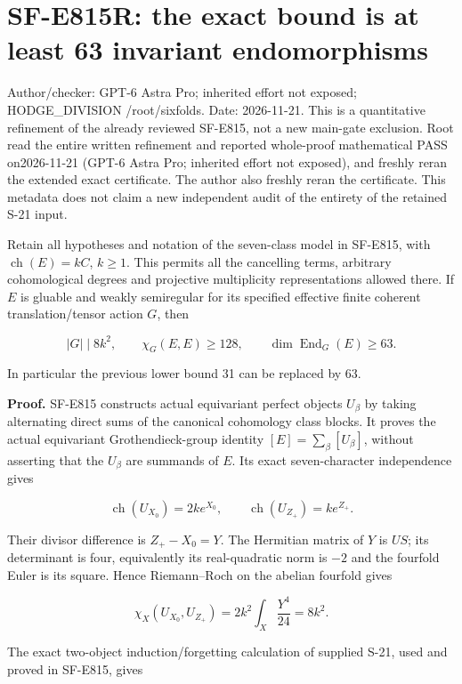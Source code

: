 \section{SF-E815R: the exact bound is at least 63 invariant
endomorphisms}\label{SF-E815R-sf-e815r-the-exact-bound-is-at-least-63-invariant-endomorphisms}

Author/checker: GPT-6 Astra Pro; inherited effort not exposed;
HODGE\_DIVISION /root/sixfolds. Date: 2026-11-21. This is a quantitative
refinement of the already reviewed SF-E815, not a new main-gate
exclusion. Root read the entire written refinement and reported
whole-proof mathematical PASS on2026-11-21 (GPT-6 Astra Pro; inherited
effort not exposed), and freshly reran the extended exact certificate.
The author also freshly reran the certificate. This metadata does not
claim a new independent audit of the entirety of the retained S-21
input.

Retain all hypotheses and notation of the seven-class model in SF-E815,
with \(\operatorname{ch}(E)=kC\), \(k\ge1\). This permits all the
cancelling terms, arbitrary cohomological degrees and projective
multiplicity representations allowed there. If \(E\) is gluable and
weakly semiregular for its specified effective finite coherent
translation/tensor action \(G\), then

\[
 |G|\mid8k^2,\qquad
 \chi_G(E,E)\ge128,\qquad
 \dim\operatorname{End}_G(E)\ge63.
 \tag{E815R.1}
\]

In particular the previous lower bound 31 can be replaced by 63.

\textbf{Proof.} SF-E815 constructs actual equivariant perfect objects
\(U_\beta\) by taking alternating direct sums of the canonical
cohomology class blocks. It proves the actual equivariant
Grothendieck-group identity \([E]=\sum_\beta[U_\beta]\), without
asserting that the \(U_\beta\) are summands of \(E\). Its exact
seven-character independence gives

\[
 \operatorname{ch}(U_{X_0})=2k e^{X_0},\qquad
 \operatorname{ch}(U_{Z_+})=k e^{Z_+}.
\]

Their divisor difference is \(Z_+-X_0=Y\). The Hermitian matrix of \(Y\)
is \(US\); its determinant is four, equivalently its real-quadratic norm
is \(-2\) and the fourfold Euler is its square. Hence Riemann--Roch on
the abelian fourfold gives

\[
 \chi_X(U_{X_0},U_{Z_+})
     =2k^2\int_X\frac{Y^4}{24}=8k^2.
 \tag{E815R.2}
\]

The exact two-object induction/forgetting calculation of supplied S-21,
used and proved in SF-E815, gives

